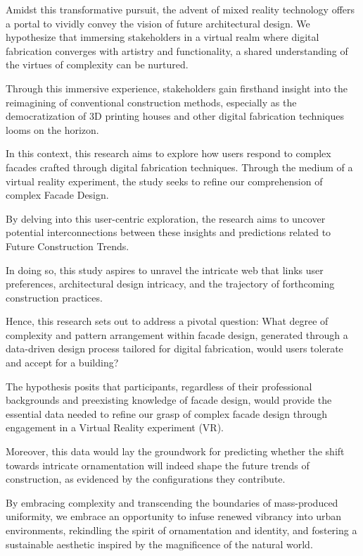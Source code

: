 Amidst this transformative pursuit, the advent of mixed reality technology offers a portal to vividly convey the vision of future architectural design.
We hypothesize that immersing stakeholders in a virtual realm where digital fabrication converges with artistry and functionality, a shared understanding of the virtues of complexity can be nurtured.

Through this immersive experience, stakeholders gain firsthand insight into the reimagining of conventional construction methods, especially as the democratization of 3D printing houses and other digital fabrication techniques looms on the horizon.

In this context, this research aims to explore  how users respond to complex facades crafted through  digital fabrication techniques.
Through the medium of a virtual reality experiment, the study seeks to refine our comprehension of complex Facade Design.

By delving into this user-centric exploration,  the research aims to uncover potential interconnections between these insights and predictions related to Future Construction Trends.

In doing so, this study aspires to unravel the intricate web that links user preferences, architectural design intricacy, and the trajectory of forthcoming construction practices.

Hence, this research sets out to address a pivotal question: What degree of complexity and pattern arrangement within facade design, generated through a data-driven design process tailored for digital fabrication, would users tolerate and accept for a building?

The hypothesis posits that participants, regardless of their professional backgrounds and preexisting knowledge of facade design, would provide the essential data needed to refine our grasp of complex facade design through engagement in a Virtual Reality experiment (VR).

Moreover, this data would lay the groundwork for predicting whether the shift towards intricate ornamentation will indeed shape the future trends of construction, as evidenced by the configurations they contribute.

By embracing complexity and transcending the boundaries of mass-produced uniformity, we embrace an opportunity to infuse renewed vibrancy into urban environments, rekindling the spirit of ornamentation and identity, and fostering a sustainable aesthetic inspired by the magnificence of the natural world.

